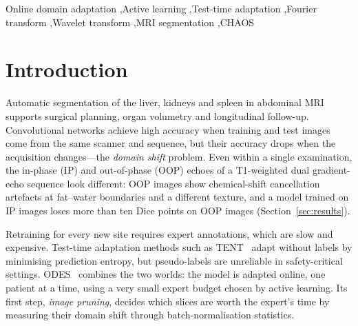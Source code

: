 \documentclass[a4paper,fleqn]{cas-sc}
\begin{document}
\begin{keywords}
Online domain adaptation \sep Active learning \sep Test-time adaptation \sep Fourier transform \sep Wavelet transform \sep MRI segmentation \sep CHAOS
\end{keywords}

\maketitle

\section{Introduction}
Automatic segmentation of the liver, kidneys and spleen in abdominal MRI supports surgical planning, organ volumetry and longitudinal follow-up. Convolutional networks achieve high accuracy when training and test images come from the same scanner and sequence, but their accuracy drops when the acquisition changes---the \emph{domain shift} problem. Even within a single examination, the in-phase (IP) and out-of-phase (OOP) echoes of a T1-weighted dual gradient-echo sequence look different: OOP images show chemical-shift cancellation artefacts at fat--water boundaries and a different texture, and a model trained on IP images loses more than ten Dice points on OOP images (Section~\ref{sec:results}).

Retraining for every new site requires expert annotations, which are slow and expensive. Test-time adaptation methods such as TENT~\cite{wang2021tent} adapt without labels by minimising prediction entropy, but pseudo-labels are unreliable in safety-critical settings. ODES~\cite{islam2025odes} combines the two worlds: the model is adapted online, one patient at a time, using a very small expert budget chosen by active learning. Its first step, \emph{image pruning}, decides which slices are worth the expert's time by measuring their domain shift through batch-normalisation statistics.
\end{document}
